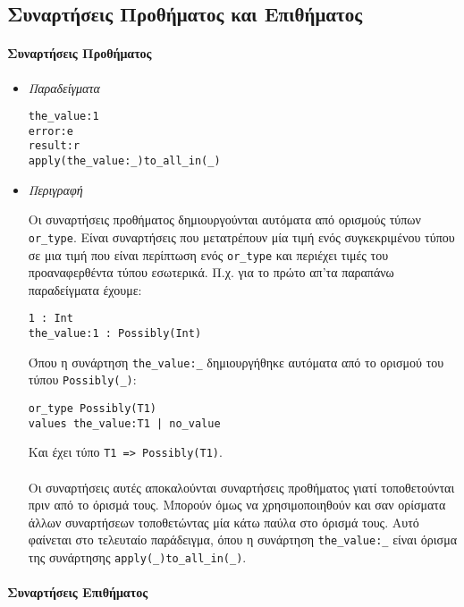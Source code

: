 \documentclass[diploma]{softlab-thesis}
\begin{document}
\newpage
\subsection{Συναρτήσεις Προθήματος και Επιθήματος}

\paragraph{Συναρτήσεις Προθήματος}

\begin{itemize}

\item \textit{Παραδείγματα}
\begin{verbatim}
the_value:1
error:e
result:r
apply(the_value:_)to_all_in(_)
\end{verbatim}

\item \textit{Περιγραφή}

Οι συναρτήσεις προθήματος δημιουργούνται αυτόματα από ορισμούς τύπων
\verb|or_type|. Είναι συναρτήσεις που μετατρέπουν μία τιμή ενός συγκεκριμένου
τύπου σε μια τιμή που είναι περίπτωση ενός \verb|or_type| και περιέχει
τιμές του προαναφερθέντα τύπου εσωτερικά.
Π.χ. για το πρώτο απ'τα παραπάνω παραδείγματα έχουμε:
\begin{verbatim}
1 : Int
the_value:1 : Possibly(Int)
\end{verbatim}
Όπου η συνάρτηση \verb|the_value:_| δημιουργήθηκε αυτόματα από το ορισμού
του τύπου \verb|Possibly(_)|:
\begin{verbatim}
or_type Possibly(T1)
values the_value:T1 | no_value
\end{verbatim}
Και έχει τύπο \verb|T1 => Possibly(T1)|.
\\\\
Οι συναρτήσεις αυτές αποκαλούνται συναρτήσεις προθήματος γιατί τοποθετούνται
πριν από το όρισμά τους. Μπορούν όμως να χρησιμοποιηθούν και σαν ορίσματα άλλων
συναρτήσεων τοποθετώντας μία κάτω παύλα στο όρισμά τους.  Αυτό φαίνεται
στο τελευταίο παράδειγμα, όπου η συνάρτηση \verb|the_value:_| είναι όρισμα της
συνάρτησης \verb|apply(_)to_all_in(_)|.

\end{itemize}

\newpage
\paragraph{Συναρτήσεις Επιθήματος}
\end{document}
